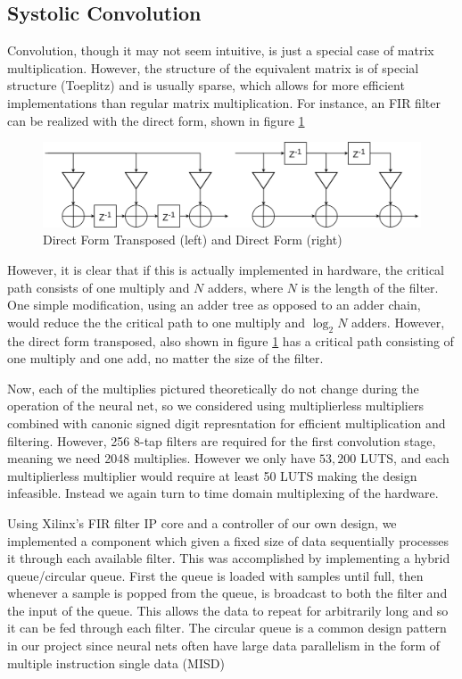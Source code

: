 \subsection{Systolic Convolution}
Convolution, though it may not seem intuitive, is just a special case of matrix multiplication.  However, the structure of the equivalent matrix is of special structure (Toeplitz) and is usually sparse, which allows for more efficient implementations than regular matrix multiplication.  For instance, an FIR filter can be realized with the direct form, shown in figure \ref{fig:df1}

\begin{figure}[H]
\includegraphics[width=\textwidth]{fir.png}
\caption{Direct Form Transposed (left) and Direct Form (right)}
\label{fig:df1}
\centering
\end{figure}

However, it is clear that if this is actually implemented in hardware, the critical path consists of one multiply and $N$ adders, where $N$ is the length of the filter.  One simple modification, using an adder tree as opposed to an adder chain, would reduce the the critical path to one multiply and $\log_2N$ adders.  However, the direct form transposed, also shown in figure \ref{fig:df1} has a critical path consisting of one multiply and one add, no matter the size of the filter.

Now, each of the multiplies pictured theoretically do not change during the operation of the neural net, so we considered using multiplierless multipliers combined with canonic signed digit represntation for efficient multiplication and filtering.  However, 256 8-tap filters are required for the first convolution stage, meaning we need 2048 multiplies.  However we only have $53,200$ LUTS, and each multiplierless multiplier would require at least 50 LUTS making the design infeasible.  Instead we again turn to time domain multiplexing of the hardware.

Using Xilinx's FIR filter IP core and a controller of our own design, we implemented a component which given a fixed size of data sequentially processes it through each available filter.  This was accomplished by implementing a hybrid queue/circular queue.  First the queue is loaded with samples until full, then whenever a sample is popped from the queue, is broadcast to both the filter and the input of the queue.  This allows the data to repeat for arbitrarily long and so it can be fed through each filter.  The circular queue is a common design pattern in our project since neural nets often have large data parallelism in the form of multiple instruction single data (MISD)

